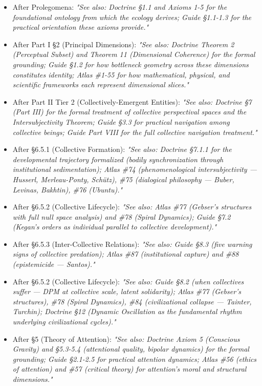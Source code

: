 \begin{itemize}[nosep,leftmargin=*]
  \item After Prolegomena: \textit{"See also: Doctrine §1.1 and Axioms 1-5 for the foundational ontology from which the ecology derives; Guide §1.1-1.3 for the practical orientation these axioms provide."}
  \item After Part I §2 (Principal Dimensions): \textit{"See also: Doctrine Theorem 2 (Perceptual Subset) and Theorem 11 (Dimensional Coherence) for the formal grounding; Guide §1.2 for how bottleneck geometry across these dimensions constitutes identity; Atlas \#1-55 for how mathematical, physical, and scientific frameworks each represent dimensional slices."}
  \item After Part II Tier 2 (Collectively-Emergent Entities): \textit{"See also: Doctrine §7 (Part III) for the formal treatment of collective perspectival spaces and the Intersubjectivity Theorem; Guide §3.3 for practical navigation among collective beings; Guide Part VIII for the full collective navigation treatment."}
  \item After §6.5.1 (Collective Formation): \textit{"See also: Doctrine §7.1.1 for the developmental trajectory formalized (bodily synchronization through institutional sedimentation); Atlas \#74 (phenomenological intersubjectivity — Husserl, Merleau-Ponty, Schütz), \#75 (dialogical philosophy — Buber, Levinas, Bakhtin), \#76 (Ubuntu)."}
  \item After §6.5.2 (Collective Lifecycle): \textit{"See also: Atlas \#77 (Gebser's structures with full null space analysis) and \#78 (Spiral Dynamics); Guide §7.2 (Kegan's orders as individual parallel to collective development)."}
  \item After §6.5.3 (Inter-Collective Relations): \textit{"See also: Guide §8.3 (five warning signs of collective predation); Atlas \#87 (institutional capture) and \#88 (epistemicide — Santos)."}
  \item After §6.5.2 (Collective Lifecycle): \textit{"See also: Guide §8.2 (when collectives suffer — DPM at collective scale, latent solidarity); Atlas \#77 (Gebser's structures), \#78 (Spiral Dynamics), \#84 (civilizational collapse — Tainter, Turchin); Doctrine §12 (Dynamic Oscillation as the fundamental rhythm underlying civilizational cycles)."}
  \item After §5 (Theory of Attention): \textit{"See also: Doctrine Axiom 5 (Conscious Gravity) and §5.3-5.4 (attentional quality, bipolar dynamics) for the formal grounding; Guide §2.1-2.5 for practical attention dynamics; Atlas \#56 (ethics of attention) and \#57 (critical theory) for attention's moral and structural dimensions."}

\end{itemize}

